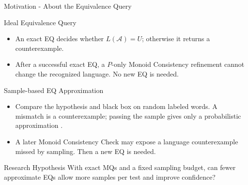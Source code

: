 \documentclass{beamer}
\begin{document}
\begin{frame}{Motivation - About the Equivalence Query}
    \footnotesize
    \begin{block}{Ideal Equivalence Query}
        \begin{itemize}
            \item An exact EQ decides whether $L(\mathcal{A})=U$; otherwise it
            returns a counterexample.
            \item After a successful exact EQ, a $P$-only Monoid Consistency
            refinement cannot change the recognized language. No new EQ is needed.
        \end{itemize}
    \end{block}
    \vspace{-0.5em}

    \begin{block}{Sample-based EQ Approximation}
        \begin{itemize}
            \item Compare the hypothesis and black box on random labeled words.
            A mismatch is a counterexample; passing the sample gives only a
            probabilistic approximation \cite[Sec.~4]{angluin87}.
            \item A later Monoid Consistency Check may expose a language
            counterexample missed by sampling. Then a new EQ is needed.
        \end{itemize}
    \end{block}
    \vspace{-0.5em}

    \begin{alertblock}{Research Hypothesis}
        With exact MQs and a fixed sampling budget, can fewer approximate EQs
        allow more samples per test and improve confidence?
    \end{alertblock}
\end{frame}
\end{document}
